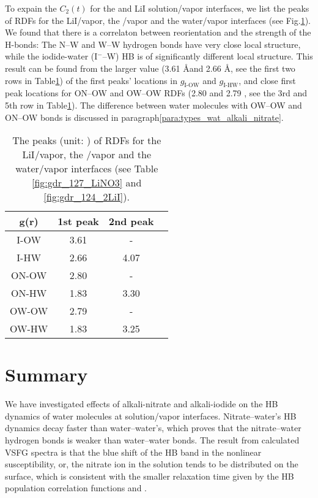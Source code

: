 To expain the $C_2(t)$ for the \LiN and LiI solution/vapor interfaces, 
we list the peaks of RDFs for the LiI/vapor, the \LiN/vapor and the water/vapor interfaces (see Fig.\thinspace\ref{tab:rdf_I2wat_peaks}).
We found that there is a correlaton between reorientation and the strength of the H-bonds:
The N--W and W--W hydrogen bonds have very close local structure, while the iodide-water (I$^-$--W) HB is of significantly different local structure.
This result can be found from the larger value (3.61 \AA and 2.66 \AA, 
see the first two rows in Table\thinspace\ref{tab:rdf_I2wat_peaks}) of the first peaks' locations in $g_\text{I-OW}$ and $g_\text{I-HW}$,
and close first peak locations for ON--OW and OW--OW RDFs (2.80 \A and 2.79 \A, see the 3rd and 5th row in Table\thinspace\ref{tab:rdf_I2wat_peaks}). 
The difference between water molecules with OW--OW and ON--OW bonds is discussed in paragraph\thinspace\ref{para:types_wat_alkali_nitrate}.
\begin{table}[H]
\centering
\caption{\label{tab:rdf_I2wat_peaks} 
The peaks (unit: \A) of RDFs for the LiI/vapor, the \LiN/vapor and the water/vapor interfaces (see Table \ref{fig:gdr_127_LiNO3} and \ref{fig:gdr_124_2LiI}). 
}
\begin{tabular}{cccc}
 g(r) & 1st peak & 2nd peak \\
\hline
 I-OW & 3.61 & - \\
 I-HW & 2.66 & 4.07 \\
 ON-OW & 2.80 & -\\
 ON-HW & 1.83 & 3.30 \\
 OW-OW & 2.79 & - \\
 OW-HW & 1.83 & 3.25 \\
\end{tabular}
\end{table} 

\section{Summary}
We have investigated effects of alkali-nitrate and alkali-iodide on the HB dynamics
of water molecules at solution/vapor interfaces.
Nitrate--water's HB dynamics decay faster than water--water's, 
which proves that the nitrate--water hydrogen bonds is weaker than water--water bonds. 
The result from calculated VSFG spectra is that the blue shift of the HB band in the nonlinear susceptibility, 
or, the nitrate ion in the solution tends to be distributed on the surface, 
which is consistent with the smaller relaxation time given by the HB population correlation functions \CHB and \SHB.


